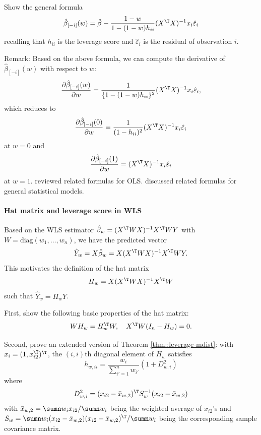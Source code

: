 Show the general formula 
$$
\hat{\beta}_{[-i]}(w) = \hat{\beta}  - \frac{1-w}{1-(1-w)h_{ii}}  (X^{\T} X)^{-1} x_i \hat{\varepsilon}_i
$$
recalling that $h_{ii}$ is the leverage score and $\hat{\varepsilon}_i$ is the residual of observation $i$. 



Remark: 
Based on the above formula, we can compute the derivative of $\hat{\beta}_{[-i]}(w) $ with respect to $w$:
$$
\frac{ \partial  \hat{\beta}_{[-i]}(w)  }{  \partial  w } = \frac{1}{\{ 1-(1-w)h_{ii} \}^2} (X^{\T} X)^{-1} x_i \hat{\varepsilon}_i,
$$
which reduces to 
$$
\frac{ \partial  \hat{\beta}_{[-i]}(0)  }{  \partial  w } = \frac{1}{( 1-h_{ii} )^2} (X^{\T} X)^{-1} x_i \hat{\varepsilon}_i
$$
at $w=0$ and 
$$
\frac{ \partial  \hat{\beta}_{[-i]}(1)  }{  \partial  w } =  (X^{\T} X)^{-1} x_i \hat{\varepsilon}_i
$$
at $w=1$. 
\citet{pregibon1981logistic} reviewed related formulas for OLS.
\citet{broderick2020automatic} discussed related formulas for general statistical models. 




 
 \paragraph{Hat matrix and leverage score in WLS}
 \label{hw16::hat-matrix-leverage-scores}
 
 
 Based on the WLS estimator $\hat{\beta}_w = (X^{\T}  W X)^{-1} X^{\T} W Y $ with $W = \text{diag}(w_1, \ldots, w_n)$, we have the predicted vector 
 $$
 \hat{Y}_w = X \hat{\beta}_w  =  X (X^{\T}  W X)^{-1} X^{\T} W Y.
 $$
 This motivates the definition of the hat matrix 
 $$
H_w =   X (X^{\T}WX)^{-1} X^{\T}W 
$$
 such that $ \hat{Y}_w = H_w Y$. 
 
First, show the following basic properties of the hat matrix:
$$
WH_w = H_w^{\T} W,\quad X^{\T} W (I_n - H_w) = 0.
$$

Second, prove an extended version of Theorem \ref{thm::leverage-mdist}: with $x_i = (1,x_{i2}^{\T} )^{\T} $, the $(i,i)$th diagonal element of $H_w$ satisfies
$$
h_{w,ii} = \frac{w_i}{  \sum_{i'=1}^n w_{i'} }  (1 + D_{w,i}^2)
$$ 
where 
$$
D_{w,i}^2 =   (x_{i2} - \bar{x}_{w,2})^{\T} S_w^{-1}  (x_{i2} - \bar{x}_{w,2})
$$
with $\bar{x}_{w,2} = \sumn  w_i x_{i2}  / \sumn  w_i $ being the weighted average of $x_{i2}$'s and  $S_w   =   \sumn w_i (x_{i2} - \bar{x}_{w,2})(x_{i2} - \bar{x}_{w,2})^{\T} / \sumn w_i  $ being the corresponding sample covariance matrix. 
 
